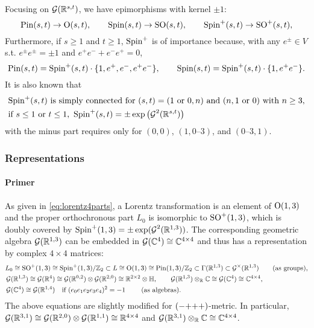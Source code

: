\documentclass[CheatSheet]{subfiles}
\begin{document}
Focusing on $\GeoA(\RR^{s,t})$, we have epimorphisms with kernel $\pm1$:
\begin{equation}
  \Pin(s,t)\to\gO(s,t),\qquad
  \Spin(s,t)\to\gSO(s,t),\qquad
  \Spin^+(s,t)\to\gSO^+(s,t),
\end{equation}
Furthermore, if $s\ge1$ and $t\ge 1$, $\Spin^+$ is of importance because, with any $e^\pm\in V$ s.t. $e^\pm e^\pm=\pm1$ and $e^+e^-+e^-e^+=0$,
\begin{equation}
\Pin(s,t)=\Spin^+(s,t)\cdot\{1,e^+,e^-,e^+e^-\},\qquad
\Spin(s,t)=\Spin^+(s,t)\cdot\{1,e^+e^-\}.
\end{equation}
It is also known that 
\begin{align}
&\text{$\Spin^+(s,t)$ is simply connected for $(s,t)=(\text{1~or~0},n)$ and $(n,\text{1~or~0})$ with $n\ge3$},\\
&
\text{if $s\le1$ or $t\le1$, }\Spin^+({s,t})=\pm\exp\left(\GeoA^2(\RR^{s,t})\right)
\end{align}
with the minus part requires only for $(0,0)$, $(1,0\text{--}3)$, and $(0\text{--}3,1)$.


\subsubsection{Representations}
\paragraph{Primer}
As given in \eqref{eq:lorentz4parts},
a Lorentz transformation is an element of $\gO(1,3)$ and the proper orthochronous part $L_0$ is isomorphic to $\gSO^+(1,3)$, which is doubly covered by $\Spin^+(1,3)=\pm\exp(\GeoA^2(\RR^{1,3}))$.
The corresponding geometric algebra $\GeoA(\RR^{1,3})$ can be embedded in $\GeoA(\CC^4)\cong\CC^{4\times 4}$ and thus has a representation by complex $4\times4$ matrices:
\begin{align*}
&L_0\cong \gSO^+(1,3)\cong\Spin^+(1,3)/\ZZ_2\subset L\cong \gO(1,3)\cong\Pin(1,3)/\ZZ_2 \subset \Gamma(\RR^{1,3})\subset \GeoA^\times(\RR^{1,3})\qquad\text{(as groups)},\\
&\GeoA(\RR^{1,3})\cong\GeoA(\RR^4)\cong\GeoA(\RR^{0,2})\otimes\GeoA(\RR^{2,0})\cong\RR^{2\times2}\otimes\mathbb{H},\qquad
\GeoA(\RR^{1,3})\otimes_\RR \CC\cong\GeoA(\CC^4)\cong\CC^{4\times4},\\
&\GeoA(\CC^4)\cong\GeoA(\RR^{1,4})\quad\text{if $(e_0e_1e_2e_3e_4)^2=-1$ }\qquad\text{(as algebras)}.
\end{align*}
The above equations are slightly modified for $(\mppp)$-metric. In particular,
$\GeoA(\RR^{3,1})\cong\GeoA(\RR^{2,0})\otimes\GeoA(\RR^{1,1})\cong\RR^{4\times 4}$ and
$\GeoA(\RR^{3,1})\otimes_\RR \CC\cong\CC^{4\times4}$.
\end{document}
